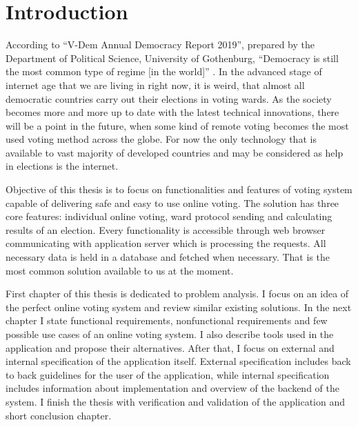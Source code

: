 \documentclass[a4paper,twoside,12pt]{book}
\newcounter{PagesWithoutNumbers}
\begin{document}
\vfill
 
 

\cleardoublepage


\pagestyle{onlyPageNumbers}
\tableofcontents

\setcounter{PagesWithoutNumbers}{\value{page}}
\mainmatter
\pagestyle{PageNumbersChapterTitles}



\chapter{Introduction}
  According to ``V-Dem Annual Democracy Report 2019'', prepared by the Department of Political Science, University of Gothenburg,
  ``Democracy is still the most common type of regime [in the world]'' \cite{bib:v-dem_report}.
  In the advanced stage of internet age that we are living in right now, it is weird, that almost all democratic countries carry out their elections in voting wards.
  As the society becomes more and more up to date with the latest technical innovations, there will be a point in the future, 
  when some kind of remote voting becomes the most used voting method across the globe.
  For now the only technology that is available to vast majority of developed countries and may be considered as help in elections is the internet. 

  Objective of this thesis is to focus on functionalities and features of voting system capable of delivering safe and easy to use online voting.
  The solution has three core features: individual online voting, ward protocol sending and calculating results of an election.
  Every functionality is accessible through web browser communicating with application server which is processing the requests.
  All necessary data is held in a database and fetched when necessary.
  That is the most common solution available to us at the moment.

  First chapter of this thesis is dedicated to problem analysis. I focus on an idea of the perfect online voting system and review similar existing solutions.
  In the next chapter I state functional requirements, nonfunctional requirements and few possible use cases of an online voting system. 
  I also describe tools used in the application and propose their alternatives.
  After that, I focus on external and internal specification of the application itself. 
  External specification includes back to back guidelines for the user of the application, while internal specification includes information about implementation and overview of the backend of the system.
  I finish the thesis with verification and validation of the application and short conclusion chapter.
\end{document}
